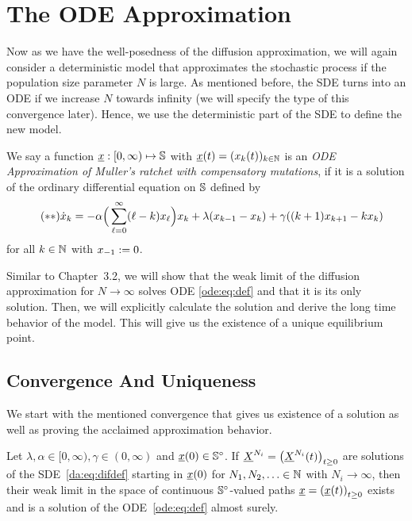 \section{The ODE Approximation}

Now as we have the well-posedness of the diffusion approximation, we will again consider a
deterministic model that approximates the stochastic process if the population size parameter $N$ is
large. As mentioned before, the SDE turns into an ODE if we increase $N$ towards infinity (we will
specify the type of this convergence later). Hence, we use the deterministic part of the SDE to
define the new model.

\begin{Definition}
We say a function $\underline{x}: [0,\infty) \mapsto \mathbb{S}$ with $ \underline{x} \! \left( t \right)  = ( x_{k} \! \left( t \right) )_{k \in
\mathbb{N}}$ is an \emph{ODE Approximation of Muller's ratchet with
compensatory mutations}, if it is a solution of the ordinary differential equation on $\mathbb{S}$ defined by
\begin{align} \label{ode:eq:def}\tag{$\ast\ast$}
  \dot {x}_k & = 
  	-\alpha \Big( \sum_{\ell=0}^\infty (\ell - k)  x_{\ell}  \Big)  x_{k}  
  	+ \lambda( x_{k-1}  -  x_{k} ) 
  	+ \gamma ((k+1) x_{k+1}  - k  x_{k} )
\end{align}
for all $k \in \mathbb{N}$ with $ x_{-1} :=0$.
\end{Definition}

\noindent
Similar to Chapter~3.2, we will show that the weak limit of the diffusion approximation for $N \to
\infty$ solves ODE \eqref{ode:eq:def} and that it is its only solution. Then, we will
explicitly calculate the solution and derive the long time behavior of the model. This will give us
the existence of a unique equilibrium point.


\subsection{Convergence And Uniqueness}

We start with the mentioned convergence that gives us existence of a solution as
well as proving the acclaimed approximation behavior.

\begin{Theorem} \label{ode:t:SDE->ODE}
Let $\lambda,\alpha \in [0,\infty),\gamma \in (0,\infty)$ and $ \underline{x} \! \left( 0 \right)  \in \mathbb{S}^\circ$. If
$\underline{X}^{N_i} = \left(\underline{X}^{N_i}(t)\right)_{t \geq 0}$ are solutions of the
SDE~\eqref{da:eq:difdef} starting in $ \underline{x} \! \left( 0 \right) $ for $N_1,N_2,\ldots \in \mathbb{N}$ with $N_i \to \infty$,
then their weak limit in the space of continuous $\mathbb{S}^\circ$-valued paths $\underline{x} = \left(  \underline{x} \! \left( t \right) \right)_{t \geq 0}$
exists and is a solution of the ODE~\eqref{ode:eq:def} almost surely.
\end{Theorem}

